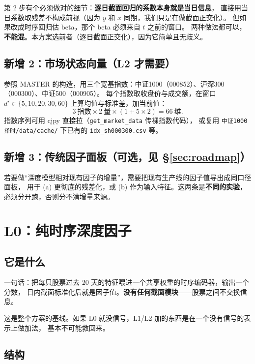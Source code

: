 \documentclass[11pt, a4paper]{ctexart}
\newcommand{\file}[1]{\texttt{\small #1}}
\begin{document}
\begin{warnbox}
第 2 步有个必须做对的细节：\textbf{逐日截面回归的系数本身就是当日信息}，
直接用当日系数取残差不构成前视（因为 $y$ 和 $x$ 同期，我们只是在做截面正交化）。
但如果改成时序回归估 beta，那个 beta 必须来自 $t$ 之前的窗口。
两种做法都可以，\textbf{不能混}。本方案选前者（逐日截面正交化），因为它简单且无歧义。
\end{warnbox}

\subsection{新增 2：市场状态向量（L2 才需要）}

参照 MASTER 的构造，用三个宽基指数：中证1000（000852）、沪深300（000300）、中证500（000905）。
每个指数取收盘价与成交额，在窗口 $d' \in \{5,10,20,30,60\}$ 上算均值与标准差，加当前值：
\[
3\ \text{指数} \times 2\ \text{量} \times (1 + 5\times 2) = 66\ \text{维}.
\]
指数序列可用 cjpy 直接拉（\file{get\_market\_data} 传裸指数代码），
或复用 \file{中证1000择时/data/cache/} 下已有的 \file{idx\_sh000300.csv} 等。

\subsection{新增 3：传统因子面板（可选，见 \S\ref{sec:roadmap}）}
若要做“深度模型相对现有因子的增量”，需要把现有生产线的因子值导出成同口径面板，
用于 (a) 更彻底的残差化，或 (b) 作为输入特征。这两条是\textbf{不同的实验}，
必须分开跑，否则分不清增量来源。

\section{L0：纯时序深度因子}

\subsection{它是什么}
一句话：把每只股票过去 20 天的特征喂进一个共享权重的时序编码器，输出一个分数，
日内截面标准化后就是因子值。\textbf{没有任何截面模块}——股票之间不交换信息。

这是整个方案的基线。如果 L0 就没信号，L1/L2 加的东西是在一个没有信号的表示上做加法，
基本不可能救回来。

\subsection{结构}
\end{document}
